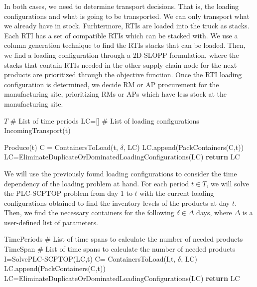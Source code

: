 In both cases, we need to determine transport decisions. That is, the loading configurations and what is going to be transported. We can only transport what we already have in stock. Furhtermore, RTIs are loaded into the truck as stacks. Each RTI has a set of compatible RTIs which can be stacked with. We use a column generation technique to find the RTIs stacks that can be loaded. Then, we find a loading configuration through a 2D-SLOPP formulation, where the stacks that contain RTIs needed in the other supply chain node for the next products are prioritized through the objective function. Once the RTI loading configuration is determined, we decide RM or AP procurement for the manufacturing site, prioritizing RMs or APs which have less stock at the manufacturing site.

\begin{algorithm}[h!]
  \caption{Loading Configurations}\label{alg:MITP}
  \begin{algorithmic}
    \State $T$ \# List of time periods
    \State LC=[] \# List of loading configurations
    \For{ $\delta \in  \Delta$ }
    \State IncomingTransport(t)

    \State Produce(t)
    \State C = ContainersToLoad(t, $\delta$, LC)
    \State
    \State
    \State LC.append(PackContainers(C,t))
    \EndWhile
    \EndFor
    \EndFor
    \State LC=EliminateDuplicateOrDominatedLoadingConfigurations(LC)
    \State \textbf{return} LC
    \EndProcedure
  \end{algorithmic}
\end{algorithm}

We will use the previously found loading configurations to consider the time dependency of the loading problem at hand. For each period $t\in T$, we will solve the PLC-SCPTOP problem from day 1 to $t$ with the current loading configurations obtained to find the inventory levels of the products at day $t$. Then, we find the necessary containers for the following $\delta \in \Delta$ days, where $\Delta$ is a user-defined list of parameters.


\begin{algorithm}[h!]
  \caption{Final Loading Configurations}\label{alg:MITP2}
  \begin{algorithmic}
    \State TimePeriods \# List of time spans to calculate the number of needed products
    \State TimeSpan \# List of time spans to calculate the number of needed products
    \State I=SolvePLC-SCPTOP(LC,t)
    \State C= ContainersToLoad(I,t, $\delta$, LC)
    \State LC.append(PackContainers(C,t))
    \EndFor
    \EndFor
    \State LC=EliminateDuplicateOrDominatedLoadingConfigurations(LC)
    \State \textbf{return} LC
    \EndProcedure
  \end{algorithmic}
\end{algorithm}




